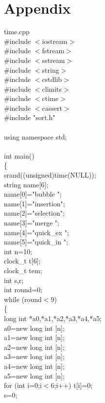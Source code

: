 \documentclass{article}
\begin{document}
\section{Appendix}
time.cpp\\
\#include $<$iostream$>$\\
\#include $<$fstream$>$\\
\#include $<$sstream$>$\\
\#include $<$string$>$\\
\#include $<$cstdlib$>$\\
\#include $<$climits$>$\\
\#include $<$ctime$>$\\
\#include $<$cassert$>$\\
\#include "sort.h"\\
\\
using namespace std;\\
\\
int main()\\
\{\\
    srand((unsigned)time(NULL));\\
    string name[6];\\
    name[0]="bubble   ";\\
    name[1]="insertion";\\
    name[2]="selection";\\
    name[3]="merge    ";\\
    name[4]="quick\_ex ";\\
    name[5]="quick\_in ";\\
    int n=10;\\
    clock\_t t[6];\\
    clock\_t tem;\\
    int s,r;\\
    int round=0;\\
    while (round$<$9)\\
    \{\\
    long int *a0,*a1,*a2,*a3,*a4,*a5;\\
    a0=new long int [n];\\
    a1=new long int [n];\\
    a2=new long int [n];\\
    a3=new long int [n];\\
    a4=new long int [n];\\
    a5=new long int [n];\\
    for (int i=0;i$<$6;i++) t[i]=0;\\
    s=0;\\
\end{document}
